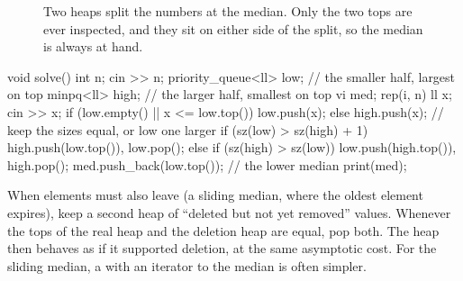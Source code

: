 \begin{figure}[htbp]
\centering
{}
\caption{Two heaps split the numbers at the median. Only the two tops are ever inspected, and they sit on either side of the
split, so the median is always at hand.}
\label{fig:twoheaps}
\end{figure}

\begin{code}
void solve() {
    int n;
    cin >> n;
    priority_queue<ll> low;  // the smaller half, largest on top
    minpq<ll> high;          // the larger half, smallest on top
    vi med;
    rep(i, n) {
        ll x;
        cin >> x;
        if (low.empty() || x <= low.top()) low.push(x);
        else high.push(x);
        // keep the sizes equal, or low one larger
        if (sz(low) > sz(high) + 1) high.push(low.top()), low.pop();
        else if (sz(high) > sz(low)) low.push(high.top()), high.pop();
        med.push_back(low.top());  // the lower median
    }
    print(med);
}
\end{code}

\begin{trick}
When elements must also leave (a sliding median, where the oldest element expires), keep a second heap of ``deleted but
not yet removed'' values. Whenever the tops of the real heap and the deletion heap are equal, pop both. The heap then behaves
as if it supported deletion, at the same asymptotic cost. For the sliding median, a  with an iterator to the
median is often simpler.
\end{trick}

